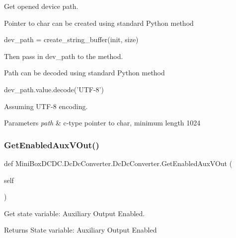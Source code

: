 Get opened device path. 

Pointer to char can be created using standard Python method \begin{DoxyVerb}dev_path = create_string_buffer(init, size)
\end{DoxyVerb}


Then pass in dev\+\_\+path to the method.

Path can be decoded using standard Python method \begin{DoxyVerb}dev_path.value.decode('UTF-8')
\end{DoxyVerb}


Assuming U\+T\+F-\/8 encoding.


\begin{DoxyParams}{Parameters}
{\em path} & c-\/type pointer to char, minimum length 1024 \\
\hline
\end{DoxyParams}
\mbox{\label{class_mini_box_d_c_d_c_1_1_dc_dc_converter_1_1_dc_dc_converter_afba56921c300608667b22030f90e8494}} 
\subsubsection{\texorpdfstring{Get\+Enabled\+Aux\+V\+Out()}{GetEnabledAuxVOut()}}
{\footnotesize\ttfamily def Mini\+Box\+D\+C\+D\+C.\+Dc\+Dc\+Converter.\+Dc\+Dc\+Converter.\+Get\+Enabled\+Aux\+V\+Out (\begin{DoxyParamCaption}\item[{}]{self }\end{DoxyParamCaption})}



Get state variable\+: Auxiliary Output Enabled. 

\begin{DoxyReturn}{Returns}
State variable\+: Auxiliary Output Enabled 
\end{DoxyReturn}
\mbox{\label{class_mini_box_d_c_d_c_1_1_dc_dc_converter_1_1_dc_dc_converter_aac3e634377f110a6a493b45075114920}} 
